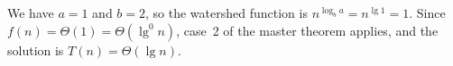 We have $a=1$ and $b=2$, so the watershed function is $n^{\log_ba}=n^{\lg1}=1$.
Since $f(n)=\Theta(1)=\Theta(\lg^0n)$, case~2 of the master theorem applies, and the solution is $T(n)=\Theta(\lg n)$.
